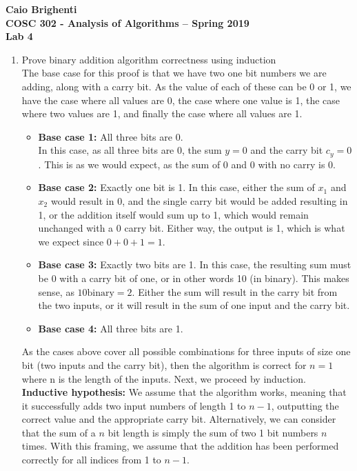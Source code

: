 \documentclass{article}
\begin{document}
\noindent \textbf{Caio Brighenti }\\
\noindent \textbf{COSC 302 - Analysis of Algorithms -- Spring 2019}\\%
\noindent \textbf{Lab 4}\vspace{1em}\\
\begin{enumerate}
	\item Prove binary addition algorithm correctness using induction \\
	The base case for this proof is that we have two one bit numbers we are adding, along with a carry bit. As the value of each of these can be 0 or 1, we have the case where all values are 0, the case where one value is 1, the case where two values are 1, and finally the case where all values are 1.
	\begin{itemize}
		\item \textbf{Base case 1: } All three bits are 0.
		\\ In this case, as all three bits are 0, the sum $y=0$ and the carry bit $c_y=0$. This is as we would expect, as the sum of 0 and 0 with no carry is 0.
		\item \textbf{Base case 2: } Exactly one bit is 1.
		In this case, either the sum of $x_1$ and $x_2$ would result in 0, and the single carry bit would be added resulting in 1, or the addition itself would sum up to 1, which would remain unchanged with a $0$ carry bit. Either way, the output is 1, which is what we expect since $0+0+1=1$.
		\item \textbf{Base case 3: } Exactly two bits are 1.
		In this case, the resulting sum must be 0 with a carry bit of one, or in other words 10 (in binary). This makes sense, as $10\text{binary} =2$. Either the sum will result in the carry bit from the two inputs, or it will result in the sum of one input and the carry bit.
		\item \textbf{Base case 4: } All three bits are 1.
	\end{itemize}
	As the cases above cover all possible combinations for three inputs of size one bit (two inputs and the carry bit), then the algorithm is correct for $n=1$ where n is the length of the inputs. Next, we proceed by induction. \\
	\textbf{Inductive hypothesis: } We assume that the algorithm works, meaning that it successfully adds two input numbers of length 1 to $n-1$, outputting the correct value and the appropriate carry bit. Alternatively, we can consider that the sum of a $n$ bit length is simply the sum of two 1 bit numbers $n$ times. With this framing, we assume that the addition has been performed correctly for all indices from 1  to $n-1$. 

\end{enumerate}
\end{document}

